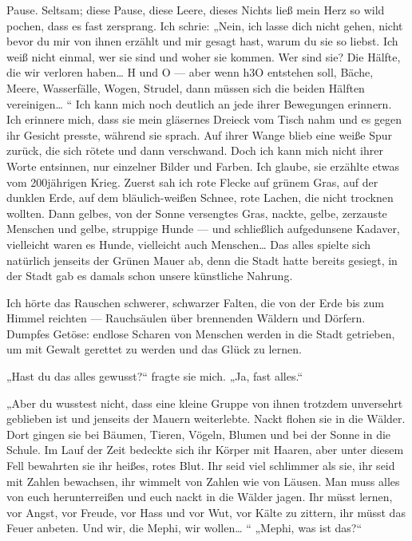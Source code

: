 Pause. Seltsam; diese Pause, diese Leere, dieses Nichts ließ mein
Herz so wild pochen, dass es fast zersprang. Ich schrie: „Nein, ich
lasse dich nicht gehen, nicht bevor du mir von ihnen erzählt und
mir gesagt hast, warum du sie so liebst. Ich weiß nicht einmal, wer
sie sind und woher sie kommen. Wer sind sie? Die Hälfte, die wir
verloren haben\ldots{} H und O — aber wenn h3O entstehen soll, Bäche,
Meere, Wasserfälle, Wogen, Strudel, dann müssen sich die beiden
Hälften vereinigen\ldots{} “ Ich kann mich noch deutlich an jede ihrer
Bewegungen erinnern. Ich erinnere mich, dass sie mein gläsernes
Dreieck vom Tisch nahm und es gegen ihr Gesicht presste, während
sie sprach. Auf ihrer Wange blieb eine weiße Spur zurück, die sich
rötete und dann verschwand. Doch ich kann mich nicht ihrer Worte
entsinnen, nur einzelner Bilder und Farben. Ich glaube, sie
erzählte etwas vom 200jährigen Krieg. Zuerst sah ich rote Flecke
auf grünem Gras, auf der dunklen Erde, auf dem bläulich-weißen
Schnee, rote Lachen, die nicht trocknen wollten. Dann gelbes, von
der Sonne versengtes Gras, nackte, gelbe, zerzauste Menschen und
gelbe, struppige Hunde — und schließlich aufgedunsene Kadaver,
vielleicht waren es Hunde, vielleicht auch Menschen\ldots{} Das alles
spielte sich natürlich jenseits der Grünen Mauer ab, denn die Stadt
hatte bereits gesiegt, in der Stadt gab es damals schon unsere
künstliche Nahrung.

Ich hörte das Rauschen schwerer, schwarzer Falten, die von der Erde
bis zum Himmel reichten — Rauchsäulen über brennenden Wäldern und
Dörfern. Dumpfes Getöse: endlose Scharen von Menschen werden in die
Stadt getrieben, um mit Gewalt gerettet zu werden und das Glück zu
lernen.

„Hast du das alles gewusst?“ fragte sie mich. „Ja, fast alles.“

„Aber du wusstest nicht, dass eine kleine Gruppe von ihnen trotzdem
unversehrt geblieben ist und jenseits der Mauern weiterlebte. Nackt
flohen sie in die Wälder. Dort gingen sie bei Bäumen, Tieren,
Vögeln, Blumen und bei der Sonne in die Schule. Im Lauf der Zeit
bedeckte sich ihr Körper mit Haaren, aber unter diesem Fell
bewahrten
sie ihr heißes, rotes Blut. Ihr seid viel schlimmer als sie, ihr
seid mit Zahlen bewachsen, ihr wimmelt von Zahlen wie von Läusen.
Man muss alles von euch herunterreißen und euch nackt in die Wälder
jagen. Ihr müsst lernen, vor Angst, vor Freude, vor Hass und vor
Wut, vor Kälte zu zittern, ihr müsst das Feuer anbeten. Und wir,
die Mephi, wir wollen\ldots{} “ „Mephi, was ist das?“


